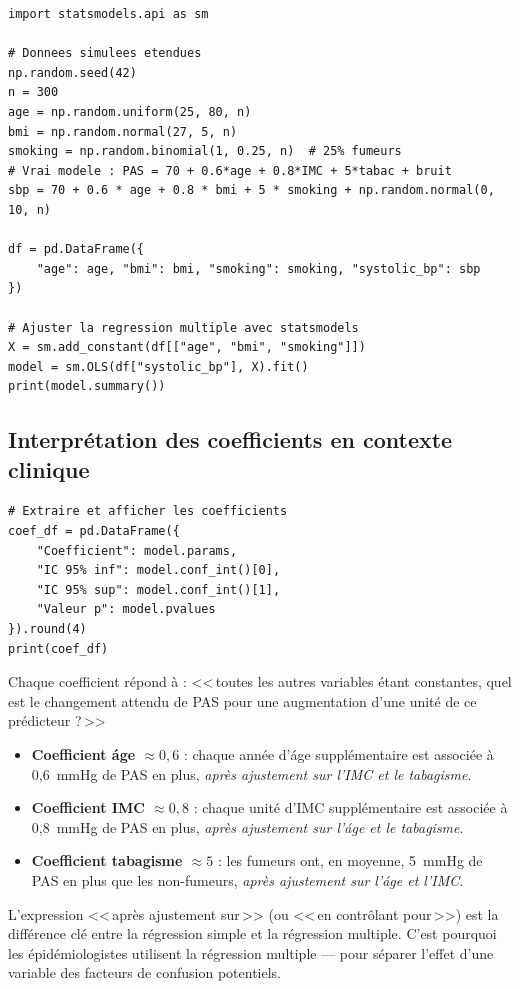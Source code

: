 \begin{verbatim}
import statsmodels.api as sm

# Donnees simulees etendues
np.random.seed(42)
n = 300
age = np.random.uniform(25, 80, n)
bmi = np.random.normal(27, 5, n)
smoking = np.random.binomial(1, 0.25, n)  # 25% fumeurs
# Vrai modele : PAS = 70 + 0.6*age + 0.8*IMC + 5*tabac + bruit
sbp = 70 + 0.6 * age + 0.8 * bmi + 5 * smoking + np.random.normal(0, 10, n)

df = pd.DataFrame({
    "age": age, "bmi": bmi, "smoking": smoking, "systolic_bp": sbp
})

# Ajuster la regression multiple avec statsmodels
X = sm.add_constant(df[["age", "bmi", "smoking"]])
model = sm.OLS(df["systolic_bp"], X).fit()
print(model.summary())
\end{verbatim}

\subsection{Interpr\'etation des coefficients en contexte clinique}

\begin{verbatim}
# Extraire et afficher les coefficients
coef_df = pd.DataFrame({
    "Coefficient": model.params,
    "IC 95% inf": model.conf_int()[0],
    "IC 95% sup": model.conf_int()[1],
    "Valeur p": model.pvalues
}).round(4)
print(coef_df)
\end{verbatim}

Chaque coefficient r\'epond \`a : <<\,toutes les autres variables \'etant constantes, quel est le changement attendu de PAS pour une augmentation d'une unit\'e de ce pr\'edicteur ?\,>>

\begin{itemize}
  \item \textbf{Coefficient \'age $\approx 0{,}6$} : chaque ann\'ee d'\'age suppl\'ementaire est associ\'ee \`a 0,6~mmHg de PAS en plus, \emph{apr\`es ajustement sur l'IMC et le tabagisme}.
  \item \textbf{Coefficient IMC $\approx 0{,}8$} : chaque unit\'e d'IMC suppl\'ementaire est associ\'ee \`a 0,8~mmHg de PAS en plus, \emph{apr\`es ajustement sur l'\'age et le tabagisme}.
  \item \textbf{Coefficient tabagisme $\approx 5$} : les fumeurs ont, en moyenne, 5~mmHg de PAS en plus que les non-fumeurs, \emph{apr\`es ajustement sur l'\'age et l'IMC}.
\end{itemize}

\begin{pythontip}
L'expression <<\,apr\`es ajustement sur\,>> (ou <<\,en contr\^olant pour\,>>) est la diff\'erence cl\'e entre la r\'egression simple et la r\'egression multiple. C'est pourquoi les \'epid\'emiologistes utilisent la r\'egression multiple --- pour s\'eparer l'effet d'une variable des facteurs de confusion potentiels.
\end{pythontip}

